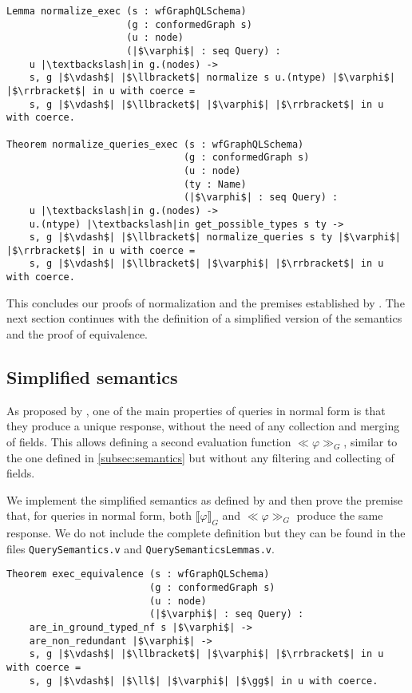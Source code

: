 \begin{verbatim}
Lemma normalize_exec (s : wfGraphQLSchema)
                     (g : conformedGraph s)
                     (u : node)
                     (|$\varphi$| : seq Query) :
    u |\textbackslash|in g.(nodes) ->
    s, g |$\vdash$| |$\llbracket$| normalize s u.(ntype) |$\varphi$| |$\rrbracket$| in u with coerce =
    s, g |$\vdash$| |$\llbracket$| |$\varphi$| |$\rrbracket$| in u with coerce.

Theorem normalize_queries_exec (s : wfGraphQLSchema)
                               (g : conformedGraph s)
                               (u : node)
                               (ty : Name)
                               (|$\varphi$| : seq Query) :
    u |\textbackslash|in g.(nodes) ->
    u.(ntype) |\textbackslash|in get_possible_types s ty ->
    s, g |$\vdash$| |$\llbracket$| normalize_queries s ty |$\varphi$| |$\rrbracket$| in u with coerce =
    s, g |$\vdash$| |$\llbracket$| |$\varphi$| |$\rrbracket$| in u with coerce.

\end{verbatim}

This concludes our proofs of normalization and the premises established by \HP{}.
The next section continues with the definition of a simplified version of the semantics
and the proof of equivalence.

\subsection{Simplified semantics}

As proposed by \HP{}, one of the main properties of queries in normal form is that they produce a unique response, without the need of any collection and merging of fields. This allows defining a second evaluation function $\ll \varphi \gg_{G}$, similar to the one defined in \ref{subsec:semantics} but without any filtering and collecting of fields.

We implement the simplified semantics as defined by \HP{} and then prove the premise that, for queries in normal form, both $\llbracket \varphi \rrbracket_{G}$ and $\ll \varphi \gg_{G}$ produce the same response. We do not include the complete definition but they can be found in the files \texttt{QuerySemantics.v} and \texttt{QuerySemanticsLemmas.v}.

\begin{verbatim}
Theorem exec_equivalence (s : wfGraphQLSchema)
                         (g : conformedGraph s)
                         (u : node)
                         (|$\varphi$| : seq Query) :
    are_in_ground_typed_nf s |$\varphi$| ->
    are_non_redundant |$\varphi$| ->
    s, g |$\vdash$| |$\llbracket$| |$\varphi$| |$\rrbracket$| in u with coerce =
    s, g |$\vdash$| |$\ll$| |$\varphi$| |$\gg$| in u with coerce.
\end{verbatim}

